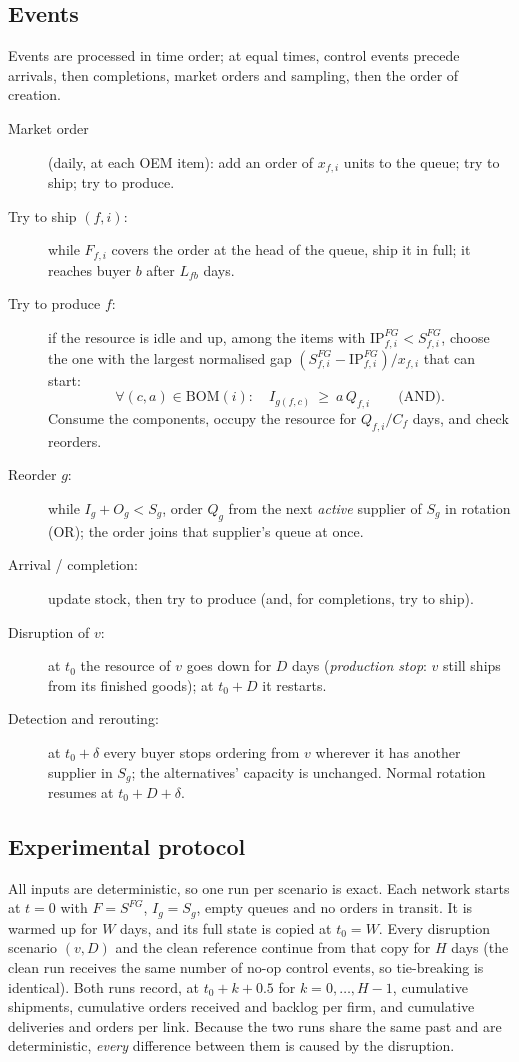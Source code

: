 \documentclass{ifacconf}
\begin{document}
\subsection{Events}
Events are processed in time order; at equal times, control events precede arrivals, then completions, market orders and sampling, then the order of creation.
\begin{description}
\item[Market order] (daily, at each OEM item): add an order of $x_{f,i}$ units to the queue; try to ship; try to produce.
\item[Try to ship $(f,i)$:] while $F_{f,i}$ covers the order at the head of the queue, ship it in full; it reaches buyer $b$ after $L_{fb}$ days.
\item[Try to produce $f$:] if the resource is idle and up, among the items with $\mathrm{IP}^{FG}_{f,i}<S^{FG}_{f,i}$, choose the one with the largest normalised gap $(S^{FG}_{f,i}-\mathrm{IP}^{FG}_{f,i})/x_{f,i}$ that can start:
\begin{equation}
\forall (c,a)\in\mathrm{BOM}(i):\quad I_{g(f,c)}\ \ge\ a\,Q_{f,i}\qquad\text{(AND)}.
\end{equation}
Consume the components, occupy the resource for $Q_{f,i}/C_f$ days, and check reorders.
\item[Reorder $g$:] while $I_g+O_g<S_g$, order $Q_g$ from the next \emph{active} supplier of $S_g$ in rotation (OR); the order joins that supplier's queue at once.
\item[Arrival / completion:] update stock, then try to produce (and, for completions, try to ship).
\item[Disruption of $v$:] at $t_0$ the resource of $v$ goes down for $D$ days (\emph{production stop}: $v$ still ships from its finished goods); at $t_0+D$ it restarts.
\item[Detection and rerouting:] at $t_0+\delta$ every buyer stops ordering from $v$ wherever it has another supplier in $S_g$; the alternatives' capacity is unchanged. Normal rotation resumes at $t_0+D+\delta$.
\end{description}

\subsection{Experimental protocol}
All inputs are deterministic, so one run per scenario is exact. Each network starts at $t=0$ with $F=S^{FG}$, $I_g=S_g$, empty queues and no orders in transit. It is warmed up for $W$ days, and its full state is copied at $t_0=W$. Every disruption scenario $(v,D)$ and the clean reference continue from that copy for $H$ days (the clean run receives the same number of no-op control events, so tie-breaking is identical). Both runs record, at $t_0+k+0.5$ for $k=0,\dots,H-1$, cumulative shipments, cumulative orders received and backlog per firm, and cumulative deliveries and orders per link. Because the two runs share the same past and are deterministic, \emph{every} difference between them is caused by the disruption.
\end{document}
